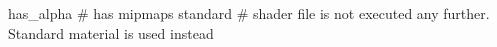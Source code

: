 has_alpha
# has mipmaps
standard     # shader file is not executed any further. Standard material is used instead

